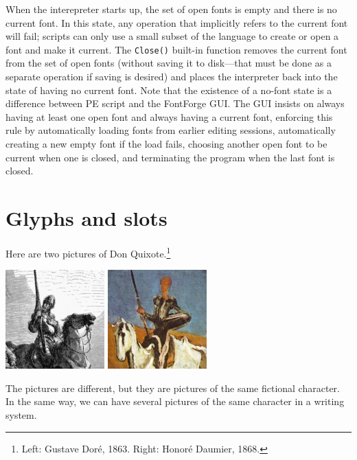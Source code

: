 \documentclass[11pt]{report}
\begin{document}
When the interepreter starts up, the set of open fonts is empty and there is
no current font.  In this state, any operation that implicitly refers to the
current font will fail; scripts can only use a small subset of the language
to create or open a font and make it current.  The \texttt{Close()} built-in
function removes the current font from the set of open fonts (without saving
it to disk---that must be done as a separate operation if saving is desired)
and places the interpreter back into the state of having no current font. 
Note that the existence of a no-font state is a difference between PE script
and the FontForge GUI.  The GUI insists on always having at least one open
font and always having a current font, enforcing this rule by automatically
loading fonts from earlier editing sessions, automatically creating a new
empty font if the load fails, choosing another open font to be current when
one is closed, and terminating the program when the last font is closed.

\section{Glyphs and slots}

Here are two pictures of Don Quixote.\footnote{Left: Gustave
Dor\'{e}, 1863.  Right: Honor\'{e} Daumier, 1868.}

\begin{center}
\includegraphics[width=1.5in]{quixote-dore.jpg}\qquad
\includegraphics[width=1.5in]{quixote-daumier.jpg}
\end{center}

The pictures are different, but they are pictures of the same fictional
character.  In the same way, we can have several pictures of the same
character in a writing system.
\end{document}
